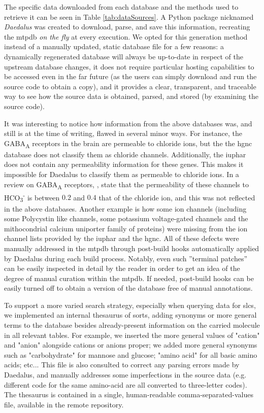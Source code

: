 The specific data downloaded from each database and the methods used to retrieve
it can be seen in Table \ref{tab:dataSources}. A Python package nicknamed
\textit{Daedalus} was created to download, parse, and save this information,
recreating the \gls{mtpdb} \textit{on the fly} at every execution. We opted for
this generation method instead of a manually updated, static database file for a
few reasons: a dynamically regenerated database will always be up-to-date in
respect of the upstream database changes, it does not require particular hosting
capabilities to be accessed even in the far future (as the users can simply
download and run the source code to obtain a copy), and it provides a clear,
transparent, and traceable way to see how the source data is obtained, parsed,
and stored (by examining the source code).

It was interesting to notice how information from the above databases was, and
still is at the time of writing, flawed in several minor ways. For instance, the
GABA\textsubscript{A} receptors in the brain are permeable to chloride ions, but
the the \gls{hgnc} database does not classify them as chloride channels.
Additionally, the \gls{iuphar} does not contain any permeability information for
these genes. This makes it impossible for Daedalus to classify them as permeable
to chloride ions.
In a review on GABA\textsubscript{A} receptors,
\textcite{goetzGABAAReceptors2007}, state that the permeability of these
channels to HCO\textsubscript{3}\textsuperscript{-} is between $0.2$ and $0.4$
that of the chloride ion, and this was not reflected in the above databases. 
Another example is how some ion channels (including some Polycystin like
channels, some potassium voltage-gated channels and the mithocondrial calcium
uniporter family of proteins) were missing from the ion channel lists provided
by the \gls{iuphar} and the \gls{hgnc}.
All of these defects were manually addressed in the \gls{mtpdb} through
post-build hooks automatically applied by Daedalus during each build process.
Notably, even such ''terminal patches'' can be easily inspected in detail by the
reader in order to get an idea of the degree of manual curation within the
\gls{mtpdb}. If needed, post-build hooks can be easily turned off to obtain a
version of the database free of manual annotations.

To support a more varied search strategy, especially when querying data for
\glspl{slc}, we implemented an internal thesaurus of sorts, adding synonyms or
more general terms to the database besides already-present information on the
carried molecule in all relevant tables. For example, we inserted the more
general values of "cation" and "anion" alongside cations or anions proper; we
added more general synonyms such as "carbohydrate" for mannose and glucose;
"amino acid" for all basic amino acids; etc...
This file is also consulted to correct any parsing errors made by Daedalus, and manually addresses some imperfections in the source data (e.g. different code for the same amino-acid are all converted to three-letter codes).
The thesaurus is contained in a single, human-readable comma-separated-values file, available in the remote repository.

